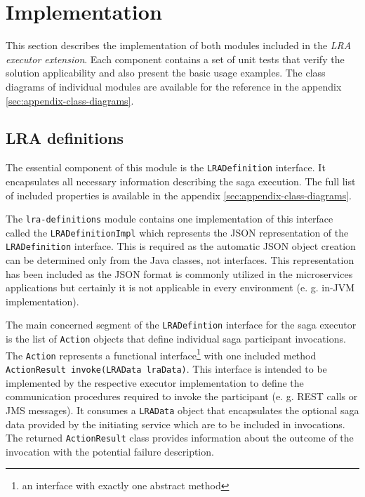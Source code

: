 \documentclass[oneside,
  digital, %
  table,   %
  nolof,     %
  nolot,     %
]{fithesis3}
\begin{document}
\section{Implementation}

This section describes the implementation of both modules included in the \textit{LRA executor extension}. Each component contains a set of unit tests that verify the solution applicability and also present the basic usage examples. The class diagrams of individual modules are available for the reference in the appendix \ref{sec:appendix-class-diagrams}.

\subsection{LRA definitions}

The essential component of this module is the \texttt{LRADefinition} interface. It encapsulates all necessary information describing the saga execution. The full list of included properties is available in the appendix \ref{sec:appendix-class-diagrams}. 

The \texttt{lra-definitions} module contains one implementation of this interface called the \texttt{LRADefinitionImpl} which represents the JSON representation of the \texttt{LRADefinition} interface. This is required as the automatic JSON object creation can be determined only from the Java classes, not interfaces. This representation has been included as the JSON format is commonly utilized in the microservices applications but certainly it is not applicable in every environment (e. g. in-JVM implementation).

The main concerned segment of the \texttt{LRADefintion} interface for the saga executor is the list of \texttt{Action} objects that define individual saga participant invocations. The \texttt{Action} represents a functional interface\footnote{an interface with exactly one abstract method} with one included method \texttt{ActionResult invoke(LRAData lraData)}. This interface is intended to be implemented by the respective executor implementation to define the communication procedures required to invoke the participant (e. g. REST calls or JMS messages). It consumes a \texttt{LRAData} object that encapsulates the optional saga data provided by the initiating service which are to be included in invocations. The returned \texttt{ActionResult} class provides information about the outcome of the invocation with the potential failure description.
\end{document}
